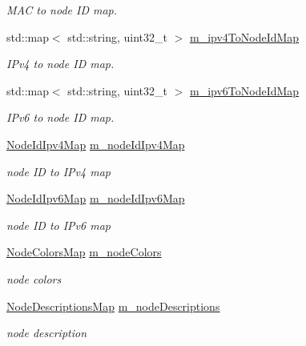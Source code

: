 \begin{DoxyCompactItemize}
\begin{DoxyCompactList}\small\item\em M\+AC to node ID map. \end{DoxyCompactList}\item 
std\+::map$<$ std\+::string, uint32\+\_\+t $>$ \hyperlink{classns3_1_1AnimationInterface_ae8061a2f8540660d0fa851e98d8c7565}{m\+\_\+ipv4\+To\+Node\+Id\+Map}
\begin{DoxyCompactList}\small\item\em I\+Pv4 to node ID map. \end{DoxyCompactList}\item 
std\+::map$<$ std\+::string, uint32\+\_\+t $>$ \hyperlink{classns3_1_1AnimationInterface_a210f45afded4e4f536aa41df0554a25e}{m\+\_\+ipv6\+To\+Node\+Id\+Map}
\begin{DoxyCompactList}\small\item\em I\+Pv6 to node ID map. \end{DoxyCompactList}\item 
\hyperlink{classns3_1_1AnimationInterface_ae425e5a70267f86f9c979eda36573041}{Node\+Id\+Ipv4\+Map} \hyperlink{classns3_1_1AnimationInterface_a650549da1cf4af73d8f7962a4f7575fc}{m\+\_\+node\+Id\+Ipv4\+Map}
\begin{DoxyCompactList}\small\item\em node ID to I\+Pv4 map \end{DoxyCompactList}\item 
\hyperlink{classns3_1_1AnimationInterface_a39ea5e1a91cfc2537825073a9bc8bd58}{Node\+Id\+Ipv6\+Map} \hyperlink{classns3_1_1AnimationInterface_a99ebc7b3218dbba35f3d2d21637485d0}{m\+\_\+node\+Id\+Ipv6\+Map}
\begin{DoxyCompactList}\small\item\em node ID to I\+Pv6 map \end{DoxyCompactList}\item 
\hyperlink{classns3_1_1AnimationInterface_a1aa744d7fb287937039e55371802f8ce}{Node\+Colors\+Map} \hyperlink{classns3_1_1AnimationInterface_a39d92e93523358f94cd6211da106ba8b}{m\+\_\+node\+Colors}
\begin{DoxyCompactList}\small\item\em node colors \end{DoxyCompactList}\item 
\hyperlink{classns3_1_1AnimationInterface_a493cca9d5a60ca9be9ffd26c57f94d34}{Node\+Descriptions\+Map} \hyperlink{classns3_1_1AnimationInterface_a857ead3ae3bbdaa441e15c45a5dde5de}{m\+\_\+node\+Descriptions}
\begin{DoxyCompactList}\small\item\em node description \end{DoxyCompactList}\item 

\end{DoxyCompactItemize}
